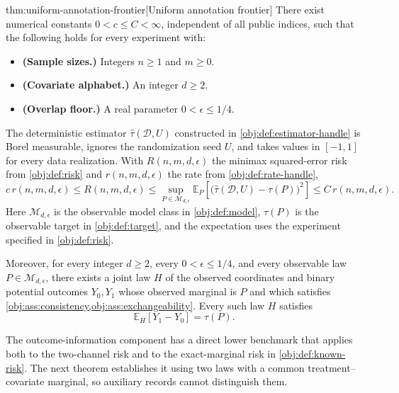 \documentclass[11pt]{article}
\begin{document}
\begin{theoremv}{thm:uniform-annotation-frontier}[Uniform annotation frontier]
There exist numerical constants \(0<c\le C<\infty\), independent of all public indices, such that the following holds for every experiment with:
\begin{itemize}
\item \textbf{(Sample sizes.)} Integers \(n\ge1\) and \(m\ge0\).
\item \textbf{(Covariate alphabet.)} An integer \(d\ge2\).
\item \textbf{(Overlap floor.)} A real parameter \(0<\epsilon\le1/4\).
\end{itemize}
The deterministic estimator \(\widehat\tau(\mathcal D,U)\) constructed in \cref{obj:def:estimator-handle} is Borel measurable, ignores the randomization seed \(U\), and takes values in \([-1,1]\) for every data realization. With \(R(n,m,d,\epsilon)\) the minimax squared-error risk from \cref{obj:def:risk} and \(r(n,m,d,\epsilon)\) the rate from \cref{obj:def:rate-handle},
\[
c\,r(n,m,d,\epsilon)
\le R(n,m,d,\epsilon)
\le \sup_{P\in\mathcal M_{d,\epsilon}}
\mathbb E_P\!\left[
\bigl(\widehat\tau(\mathcal D,U)-\tau(P)\bigr)^2
\right]
\le C\,r(n,m,d,\epsilon).
\]
Here \(\mathcal M_{d,\epsilon}\) is the observable model class in \cref{obj:def:model}, \(\tau(P)\) is the observable target in \cref{obj:def:target}, and the expectation uses the experiment specified in \cref{obj:def:risk}.

Moreover, for every integer \(d\ge2\), every \(0<\epsilon\le1/4\), and every observable law \(P\in\mathcal M_{d,\epsilon}\), there exists a joint law \(H\) of the observed coordinates and binary potential outcomes \(Y_0,Y_1\) whose observed marginal is \(P\) and which satisfies \cref{obj:ass:consistency,obj:ass:exchangeability}. Every such law \(H\) satisfies
\[
\mathbb E_H[Y_1-Y_0]=\tau(P).
\]
\end{theoremv}

The outcome-information component has a direct lower benchmark that applies both to the two-channel risk and to the exact-marginal risk in \cref{obj:def:known-risk}. The next theorem establishes it using two laws with a common treatment--covariate marginal, so auxiliary records cannot distinguish them.
\end{document}
